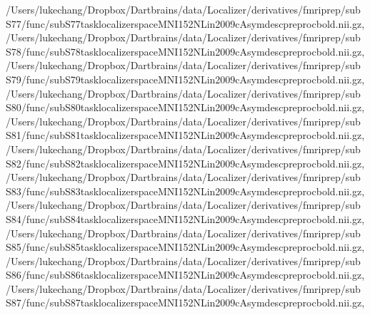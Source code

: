 \documentclass[letterpaper,10pt,english]{sphinxmanual}
\begin{document}
\begin{sphinxVerbatim}[commandchars=\\\{\}]
 \PYGZsq{}/Users/lukechang/Dropbox/Dartbrains/data/Localizer/derivatives/fmriprep/sub\PYGZhy{}S77/func/sub\PYGZhy{}S77\PYGZus{}task\PYGZhy{}localizer\PYGZus{}space\PYGZhy{}MNI152NLin2009cAsym\PYGZus{}desc\PYGZhy{}preproc\PYGZus{}bold.nii.gz\PYGZsq{},
 \PYGZsq{}/Users/lukechang/Dropbox/Dartbrains/data/Localizer/derivatives/fmriprep/sub\PYGZhy{}S78/func/sub\PYGZhy{}S78\PYGZus{}task\PYGZhy{}localizer\PYGZus{}space\PYGZhy{}MNI152NLin2009cAsym\PYGZus{}desc\PYGZhy{}preproc\PYGZus{}bold.nii.gz\PYGZsq{},
 \PYGZsq{}/Users/lukechang/Dropbox/Dartbrains/data/Localizer/derivatives/fmriprep/sub\PYGZhy{}S79/func/sub\PYGZhy{}S79\PYGZus{}task\PYGZhy{}localizer\PYGZus{}space\PYGZhy{}MNI152NLin2009cAsym\PYGZus{}desc\PYGZhy{}preproc\PYGZus{}bold.nii.gz\PYGZsq{},
 \PYGZsq{}/Users/lukechang/Dropbox/Dartbrains/data/Localizer/derivatives/fmriprep/sub\PYGZhy{}S80/func/sub\PYGZhy{}S80\PYGZus{}task\PYGZhy{}localizer\PYGZus{}space\PYGZhy{}MNI152NLin2009cAsym\PYGZus{}desc\PYGZhy{}preproc\PYGZus{}bold.nii.gz\PYGZsq{},
 \PYGZsq{}/Users/lukechang/Dropbox/Dartbrains/data/Localizer/derivatives/fmriprep/sub\PYGZhy{}S81/func/sub\PYGZhy{}S81\PYGZus{}task\PYGZhy{}localizer\PYGZus{}space\PYGZhy{}MNI152NLin2009cAsym\PYGZus{}desc\PYGZhy{}preproc\PYGZus{}bold.nii.gz\PYGZsq{},
 \PYGZsq{}/Users/lukechang/Dropbox/Dartbrains/data/Localizer/derivatives/fmriprep/sub\PYGZhy{}S82/func/sub\PYGZhy{}S82\PYGZus{}task\PYGZhy{}localizer\PYGZus{}space\PYGZhy{}MNI152NLin2009cAsym\PYGZus{}desc\PYGZhy{}preproc\PYGZus{}bold.nii.gz\PYGZsq{},
 \PYGZsq{}/Users/lukechang/Dropbox/Dartbrains/data/Localizer/derivatives/fmriprep/sub\PYGZhy{}S83/func/sub\PYGZhy{}S83\PYGZus{}task\PYGZhy{}localizer\PYGZus{}space\PYGZhy{}MNI152NLin2009cAsym\PYGZus{}desc\PYGZhy{}preproc\PYGZus{}bold.nii.gz\PYGZsq{},
 \PYGZsq{}/Users/lukechang/Dropbox/Dartbrains/data/Localizer/derivatives/fmriprep/sub\PYGZhy{}S84/func/sub\PYGZhy{}S84\PYGZus{}task\PYGZhy{}localizer\PYGZus{}space\PYGZhy{}MNI152NLin2009cAsym\PYGZus{}desc\PYGZhy{}preproc\PYGZus{}bold.nii.gz\PYGZsq{},
 \PYGZsq{}/Users/lukechang/Dropbox/Dartbrains/data/Localizer/derivatives/fmriprep/sub\PYGZhy{}S85/func/sub\PYGZhy{}S85\PYGZus{}task\PYGZhy{}localizer\PYGZus{}space\PYGZhy{}MNI152NLin2009cAsym\PYGZus{}desc\PYGZhy{}preproc\PYGZus{}bold.nii.gz\PYGZsq{},
 \PYGZsq{}/Users/lukechang/Dropbox/Dartbrains/data/Localizer/derivatives/fmriprep/sub\PYGZhy{}S86/func/sub\PYGZhy{}S86\PYGZus{}task\PYGZhy{}localizer\PYGZus{}space\PYGZhy{}MNI152NLin2009cAsym\PYGZus{}desc\PYGZhy{}preproc\PYGZus{}bold.nii.gz\PYGZsq{},
 \PYGZsq{}/Users/lukechang/Dropbox/Dartbrains/data/Localizer/derivatives/fmriprep/sub\PYGZhy{}S87/func/sub\PYGZhy{}S87\PYGZus{}task\PYGZhy{}localizer\PYGZus{}space\PYGZhy{}MNI152NLin2009cAsym\PYGZus{}desc\PYGZhy{}preproc\PYGZus{}bold.nii.gz\PYGZsq{},

\end{sphinxVerbatim}
\end{document}
